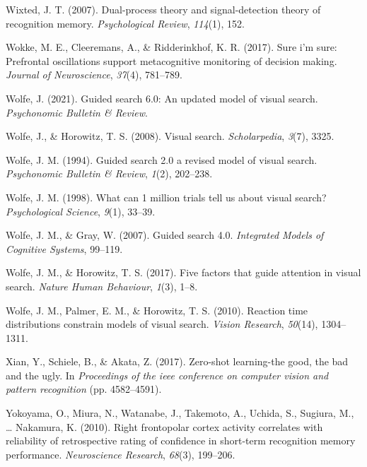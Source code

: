 \documentclass[12pt,twoside]{reedthesis}
\begin{document}
\leavevmode\hypertarget{ref-wixted2007dual}{}%
Wixted, J. T. (2007). Dual-process theory and signal-detection theory of recognition memory. \emph{Psychological Review}, \emph{114}(1), 152.

\leavevmode\hypertarget{ref-wokke2017sure}{}%
Wokke, M. E., Cleeremans, A., \& Ridderinkhof, K. R. (2017). Sure i'm sure: Prefrontal oscillations support metacognitive monitoring of decision making. \emph{Journal of Neuroscience}, \emph{37}(4), 781--789.

\leavevmode\hypertarget{ref-wolfe2021guided}{}%
Wolfe, J. (2021). Guided search 6.0: An updated model of visual search. \emph{Psychonomic Bulletin \& Review}.

\leavevmode\hypertarget{ref-wolfe2008visual}{}%
Wolfe, J., \& Horowitz, T. S. (2008). Visual search. \emph{Scholarpedia}, \emph{3}(7), 3325.

\leavevmode\hypertarget{ref-wolfe1994guided}{}%
Wolfe, J. M. (1994). Guided search 2.0 a revised model of visual search. \emph{Psychonomic Bulletin \& Review}, \emph{1}(2), 202--238.

\leavevmode\hypertarget{ref-wolfe1998can}{}%
Wolfe, J. M. (1998). What can 1 million trials tell us about visual search? \emph{Psychological Science}, \emph{9}(1), 33--39.

\leavevmode\hypertarget{ref-wolfe2007guided}{}%
Wolfe, J. M., \& Gray, W. (2007). Guided search 4.0. \emph{Integrated Models of Cognitive Systems}, 99--119.

\leavevmode\hypertarget{ref-wolfe2017five}{}%
Wolfe, J. M., \& Horowitz, T. S. (2017). Five factors that guide attention in visual search. \emph{Nature Human Behaviour}, \emph{1}(3), 1--8.

\leavevmode\hypertarget{ref-wolfe2010reaction}{}%
Wolfe, J. M., Palmer, E. M., \& Horowitz, T. S. (2010). Reaction time distributions constrain models of visual search. \emph{Vision Research}, \emph{50}(14), 1304--1311.

\leavevmode\hypertarget{ref-xian2017zero}{}%
Xian, Y., Schiele, B., \& Akata, Z. (2017). Zero-shot learning-the good, the bad and the ugly. In \emph{Proceedings of the ieee conference on computer vision and pattern recognition} (pp. 4582--4591).

\leavevmode\hypertarget{ref-yokoyama2010right}{}%
Yokoyama, O., Miura, N., Watanabe, J., Takemoto, A., Uchida, S., Sugiura, M., \ldots{} Nakamura, K. (2010). Right frontopolar cortex activity correlates with reliability of retrospective rating of confidence in short-term recognition memory performance. \emph{Neuroscience Research}, \emph{68}(3), 199--206.
\end{document}
